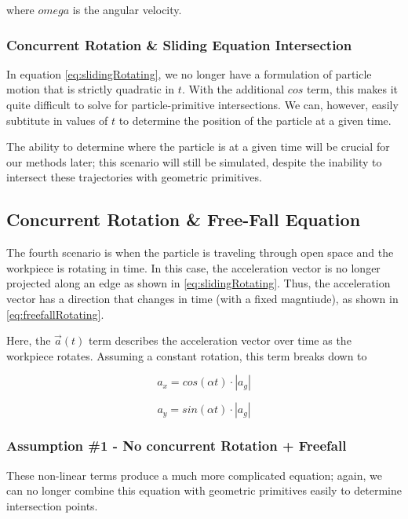 where $omega$ is the angular velocity.

		\subsubsection{Concurrent Rotation \& Sliding Equation Intersection}

In equation \eqref{eq:slidingRotating}, we no longer have a formulation of particle motion that is strictly quadratic in $t$. With the additional $cos$ term, this makes it quite difficult to solve for particle-primitive intersections. We can, however, easily subtitute in values of $t$ to determine the position of the particle at a given time.

The ability to determine where the particle is at a given time will be crucial for our methods later; this scenario will still be simulated, despite the inability to intersect these trajectories with geometric primitives.

		\subsection{Concurrent Rotation \& Free-Fall Equation}

The fourth scenario is when the particle is traveling through open space and the workpiece is rotating in time. In this case, the acceleration vector is no longer projected along an edge as shown in \eqref{eq:slidingRotating}. Thus, the acceleration vector has a direction that changes in time (with a fixed magntiude), as shown in \eqref{eq:freefallRotating}.

 {
	\label{eq:freefallRotating}
}

Here, the $\vec{a}(t)$ term describes the acceleration vector over time as the workpiece rotates. Assuming a constant rotation, this term breaks down to

$$
a_x = cos(\alpha t) \cdot |a_g|
$$

$$
a_y = sin(\alpha t) \cdot |a_g|
$$

		\subsubsection{Assumption \#1 - No concurrent Rotation + Freefall}

These non-linear terms produce a much more complicated equation; again, we can no longer combine this equation with geometric primitives easily to determine  intersection points.

